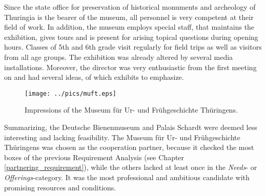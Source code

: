 Since the state office for preservation of historical monuments and archeology of Thuringia is the bearer of the museum, all personnel is very competent at their field of work. In addition, the museum employs special staff, that maintains the exhibition, gives tours and is present for arising topical questions during opening hours. Classes of 5th and 6th grade visit regularly for field trips as well as visitors from all age groups. The exhibition was already altered by several media installations. Moreover, the director was very enthusiastic from the first meeting on and had several ideas, of which exhibits to emphasize.
\begin{figure}[H]%
\texttt{[image: ../pics/muft.eps]}%
\caption{Impressions of the Museum für Ur- und Frühgeschichte Thüringens.}%
\label{fig:muft} %
\end{figure}
Summarizing, the Deutsche Bienenmuseum and Palais Schardt were deemed less interesting and lacking feasibility. The Museum für Ur- und Frühgeschichte Thüringens was chosen as the cooperation partner, because it checked the most boxes of the previous Requirement Analysis (see Chapter \ref{partnering_requirement}), while the others lacked at least once in the \textit{Needs}- or \textit{Offerings}-category. It was the most professional and ambitious candidate with promising resources and conditions.

